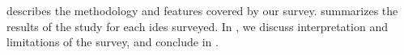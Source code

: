 
 describes the methodology and features covered by our
survey.  summarizes the results of the study for each
\acp{ide} surveyed. In , we discuss interpretation and
limitations of the survey, and conclude in .

